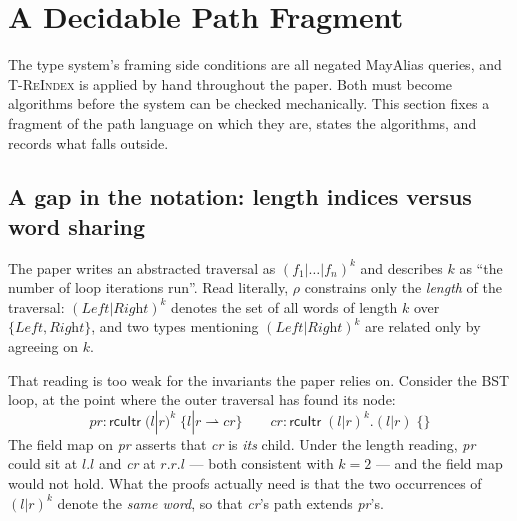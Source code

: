 %
%
%
\section{A Decidable Path Fragment}
\label{sec:pathfrag}

\newcommand{\pvar}{\pi}
\newcommand{\MayAlias}{\textsf{MayAlias}}
\providecommand{\defn}{\;\triangleq\;}
\providecommand{\RCU}{\textsf{RCU}}
\newcommand{\Fields}{\mathcal{F}}

The type system's framing side conditions are all negated \MayAlias{} queries,
and \textsc{T-ReIndex} is applied by hand throughout the paper.  Both must become
algorithms before the system can be checked mechanically.  This section fixes a
fragment of the path language on which they are, states the algorithms, and
records what falls outside.

\subsection{A gap in the notation: length indices versus word sharing}
\label{sec:pathfrag-gap}

The paper writes an abstracted traversal as $(f_1|\ldots|f_n)^{k}$ and describes
$k$ as ``the number of loop iterations run''.  Read literally, $\rho$ constrains
only the \emph{length} of the traversal: $(\textit{Left}|\textit{Right})^{k}$
denotes the set of all words of length $k$ over $\{\textit{Left},
\textit{Right}\}$, and two types mentioning $(\textit{Left}|\textit{Right})^{k}$
are related only by agreeing on $k$.

That reading is too weak for the invariants the paper relies on.  Consider the
BST loop, at the point where the outer traversal has found its node:
\[
\textit{pr} : \textsf{rcuItr}\;(l|r)^{k}\;\{l|r \rightharpoonup \textit{cr}\}
\qquad
\textit{cr} : \textsf{rcuItr}\;(l|r)^{k}.(l|r)\;\{\}
\]
The field map on \textit{pr} asserts that \textit{cr} is \emph{its} child.  Under
the length reading, \textit{pr} could sit at $l.l$ and \textit{cr} at $r.r.l$ ---
both consistent with $k = 2$ --- and the field map would not hold.  What the
proofs actually need is that the two occurrences of $(l|r)^{k}$ denote the
\emph{same word}, so that \textit{cr}'s path extends \textit{pr}'s.

